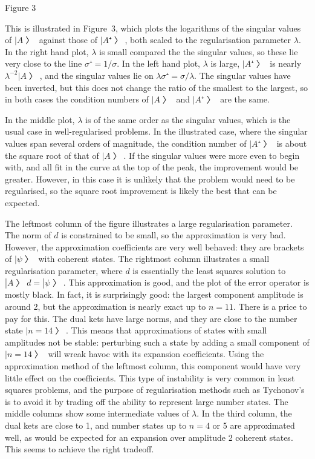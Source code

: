 \midinsert %
Figure 3 \endinsert

This is illustrated in Figure~3, which plots the logarithms of the singular values of $|A〉$ against those of $|A⁺〉$, both scaled to the regularisation parameter $λ$.  In the right hand plot, $λ$ is small compared the the singular values, so these lie very close to the line $σ⁺=1/σ$.  In the left hand plot, $λ$ is large, $|A⁺〉$ is nearly $λ^{-2}|A〉$, and the singular values lie on $λσ⁺=σ/λ$.  The singular values have been inverted, but this does not change the ratio of the smallest to the largest, so in both cases the condition numbers of $|A〉$ and $|A⁺〉$ are the same.

In the middle plot, $λ$ is of the same order as the singular values, which is the usual case in well-regularised problems.  In the illustrated case, where the singular values span several orders of magnitude, the condition number of $|A⁺〉$ is about the square root of that of $|A〉$.  If the singular values were more even to begin with, and all fit in the curve at the top of the peak, the improvement would be greater.  However, in this case it is unlikely that the problem would need to be regularised, so the square root improvement is likely the best that can be expected.

The leftmost column of the figure illustrates a large regularisation parameter.  The norm of $d$ is constrained to be small, so the approximation is very bad.  However, the approximation coefficients are very well behaved: they are brackets of $|ψ〉$ with coherent states.  The rightmost column illustrates a small regularisation parameter, where $d$ is essentially the least squares solution to $|A〉d=|ψ〉$.  This approximation is good, and the plot of the error operator is mostly black.  In fact, it is surprisingly good: the largest component amplitude is around 2, but the approximation is nearly exact up to $n=11$.  There is a price to pay for this.  The dual kets have large norms, and they are close to the number state $|n=14〉$.  This means that approximations of states with small amplitudes not be stable: perturbing such a state by adding a small component of $|n=14〉$ will wreak havoc with its expansion coefficients.  Using the approximation method of the leftmost column, this component would have very little effect on the coefficients.  This type of instability is very common in least squares problems, and the purpose of regularisation methods such as Tychonov's is to avoid it by trading off the ability to represent large number states.  The middle columns show some intermediate values of $λ$.  In the third column, the dual kets are close to 1, and number states up to $n=4$ or 5 are approximated well, as would be expected for an expansion over amplitude 2 coherent states.  This seems to achieve the right tradeoff.

